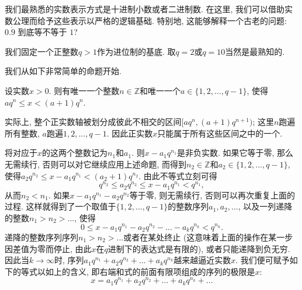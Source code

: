 

我们最熟悉的实数表示方式是十进制小数或者二进制数. 在这里, 我们可以借助实数公理而给予这些表示以严格的逻辑基础. 特别地, 这能够解释一个古老的问题: $0.\dot{9}$ 到底等不等于 $1$?

我们固定一个正整数$q>1$作为进位制的基底. 取$q=2$或$q=10$当然是最熟知的.

我们从如下非常简单的命题开始. 
\begin{lemma}{}
设实数$x>0$. 则有唯一一个整数$n\in\mathbb{Z}$和唯一一个$a\in\{1,2,...,q-1\}$, 使得$aq^n\leq x<(a+1)q^{n}$.
\end{lemma}

实际上, 整个正实数轴被划分成彼此不相交的区间$[aq^n,(a+1)q^{n+1})$; 这里$n$跑遍所有整数, $a$跑遍$1,2,...,q-1$. 因此正实数$x$只能属于所有这些区间之中的一个. 

将对应于$x$的这两个整数记为$n_1$和$a_1$. 则$x-a_1q^{n_1}$是非负实数. 如果它等于零, 那么无需续行, 否则可以对它继续应用上述命题, 而得到$n_2\in\mathbb{Z}$和$a_2\in\{1,2,...,q-1\}$, 使得$a_2q^{n_2}\leq x-a_1q^{n_1}<(a_2+1)q^{n_2}$. 由此不等式立刻可得
\[
q^{n_2}\leq a_2q^{n_2}\leq x-a_1q^{n_1}<q^{n_1},
\]
从而$n_2<n_1$. 如果$x-a_1q^{n_1}-a_2q^{n_2}$等于零, 则无需续行, 否则可以再次重复上面的过程. 这样就得到了一个取值于$\{1,2,...,q-1\}$的整数序列$a_1,a_2,...$, 以及一列递降的整数$n_1>n_2>...$, 使得
\[ 
0\leq x-a_1q^{n_1}-a_2q^{n_2}-...-a_kq^{n_k}<q^{n_k}.
\]
递降的整数序列序列$n_1>n_2>...$或者在某处终止 (这意味着上面的操作在某一步因差值为零而停止, 由此$x$在$q$进制下的表达式是有限的), 或者只能递降到负无穷. 因此当$k\to\infty$时, 序列$a_1q^{n_1}+a_2q^{n_2}+...+a_kq^{n_k}$越来越逼近实数$x$. 我们便可赋予如下的等式以如上的含义, 即右端和式的前面有限项组成的序列的极限是$x$:
\[
x=a_1q^{n_1}+a_2q^{n_2}+...+a_kq^{n_k}+...
\]
